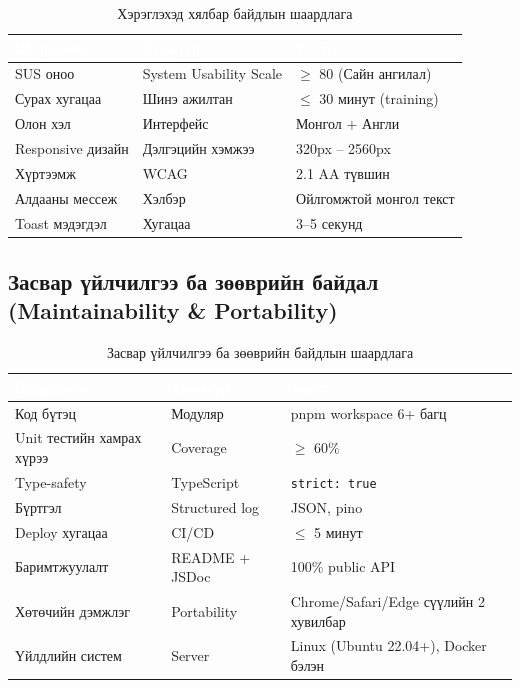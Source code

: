 \begin{table}[htbp]
\caption{Хэрэглэхэд хялбар байдлын шаардлага}
\label{tab:nfr_usability}
\centering
\small
\begin{tabularx}{\textwidth}{|L|L|Y|}
\hline
{}
\textcolor{white}{\textbf{Шаардлага}} &
\textcolor{white}{\textbf{Хэмжүүр}} &
\textcolor{white}{\textbf{Заалт}} \\ \hline
SUS оноо & System Usability Scale & $\geq$ 80 (Сайн ангилал) \\ \hline
{}
Сурах хугацаа & Шинэ ажилтан & $\leq$ 30 минут (training) \\ \hline
Олон хэл & Интерфейс & Монгол + Англи \\ \hline
{}
Responsive дизайн & Дэлгэцийн хэмжээ & 320px -- 2560px \\ \hline
Хүртээмж & WCAG & 2.1 AA түвшин \\ \hline
{}
Алдааны мессеж & Хэлбэр & Ойлгомжтой монгол текст \\ \hline
Toast мэдэгдэл & Хугацаа & 3--5 секунд \\ \hline
\end{tabularx}
\end{table}

\subsection{Засвар үйлчилгээ ба зөөврийн байдал (Maintainability \& Portability)}

\begin{table}[htbp]
\caption{Засвар үйлчилгээ ба зөөврийн байдлын шаардлага}
\label{tab:nfr_maint}
\centering
\small
\begin{tabularx}{\textwidth}{|L|L|Y|}
\hline
{}
\textcolor{white}{\textbf{Шаардлага}} &
\textcolor{white}{\textbf{Хэмжүүр}} &
\textcolor{white}{\textbf{Заалт}} \\ \hline
Код бүтэц & Модуляр & pnpm workspace 6+ багц \\ \hline
{}
Unit тестийн хамрах хүрээ & Coverage & $\geq$ 60\% \\ \hline
Type-safety & TypeScript & \texttt{strict: true} \\ \hline
{}
Бүртгэл & Structured log & JSON, pino \\ \hline
Deploy хугацаа & CI/CD & $\leq$ 5 минут \\ \hline
{}
Баримтжуулалт & README + JSDoc & 100\% public API \\ \hline
Хөтөчийн дэмжлэг & Portability & Chrome/Safari/Edge сүүлийн 2 хувилбар \\ \hline
{}
Үйлдлийн систем & Server & Linux (Ubuntu 22.04+), Docker бэлэн \\ \hline
\end{tabularx}
\end{table}

